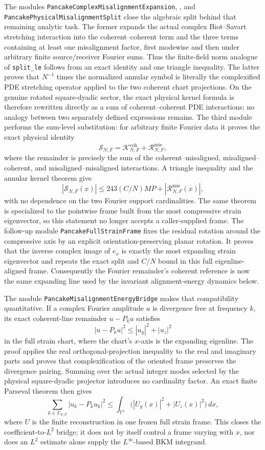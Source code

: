 \documentclass[11pt]{article}
\theoremstyle{definition}
\begin{document}
The modules \texttt{PancakeComplexMisalignmentExpansion},
, and
\texttt{PancakePhysicalMisalignmentSplit} close the algebraic split
behind that remaining analytic task.  The former expands the actual complex
Biot--Savart stretching interaction into the coherent--coherent term and the
three terms containing at least one misalignment factor, first modewise and
then under arbitrary finite source/receiver Fourier sums.  Thus the
finite-field norm analogue of \texttt{split\_le} follows from an exact
identity and one triangle inequality.  The latter proves that
$N^{-1}$ times the normalized annular symbol is literally the complexified
PDE stretching operator applied to the two coherent chart projections.  On
the genuine rotated square-dyadic sector, the exact physical kernel formula
is therefore rewritten directly as a sum of coherent--coherent PDE
interactions; no analogy between two separately defined expressions remains.
The third module performs the sum-level substitution: for arbitrary finite
Fourier data it proves the exact physical identity
\[
  \mathcal S_{N,F}
   =\mathcal K^{\mathrm{coh}}_{N,F}
    +\mathcal R^{\mathrm{mis}}_{N,F},
\]
where the remainder is precisely the sum of the coherent--misaligned,
misaligned--coherent, and misaligned--misaligned interactions.  A triangle
inequality and the annular kernel theorem give
\[
  |\mathcal S_{N,F}(x)|
   \leq 243(C/N)MP+|\mathcal R^{\mathrm{mis}}_{N,F}(x)|,
\]
with no dependence on the two Fourier support cardinalities.  The same theorem
is specialized to the pointwise frame built from the most compressive strain
eigenvector, so this statement no longer accepts a caller-supplied frame.  The
follow-up module \texttt{PancakeFullStrainFrame} fixes the residual rotation
around the compressive axis by an explicit orientation-preserving planar
rotation.  It proves that the inverse complex image of $e_x$ is exactly the
most expanding strain eigenvector and repeats the exact split and $C/N$ bound
in this full eigenline-aligned frame.  Consequently the Fourier remainder's
coherent reference is now the same expanding line used by the invariant
alignment-energy dynamics below.

The module \texttt{PancakeMisalignmentEnergyBridge} makes that compatibility
quantitative.  If a complex Fourier amplitude $u$ is divergence free at
frequency $k$, its exact coherent-line remainder $u-P_k u$ satisfies
\[
  |u-P_k u|^2
  \leq |u_y|^2+|u_z|^2
\]
in the full strain chart, where the chart's $x$-axis is the expanding
eigenline.  The proof applies the real orthogonal-projection inequality to
the real and imaginary parts and proves that complexification of the
oriented frame preserves the divergence pairing.  Summing over the actual
integer modes selected by the physical square-dyadic projector introduces no
cardinality factor.  An exact finite Parseval theorem then gives
\[
  \sum_{k\in\Gamma_{N,F}} |u_k-P_k u_k|^2
  \leq \int_{\mathbb T^3}
     \bigl(|U_y(x)|^2+|U_z(x)|^2\bigr)\,dx,
\]
where $U$ is the finite reconstruction in one frozen full strain frame.
This closes the coefficient-to-$L^2$ bridge; it does not by itself control a
frame varying with $x$, nor does an $L^2$ estimate alone supply the
$L^\infty$-based BKM integrand.
\end{document}
